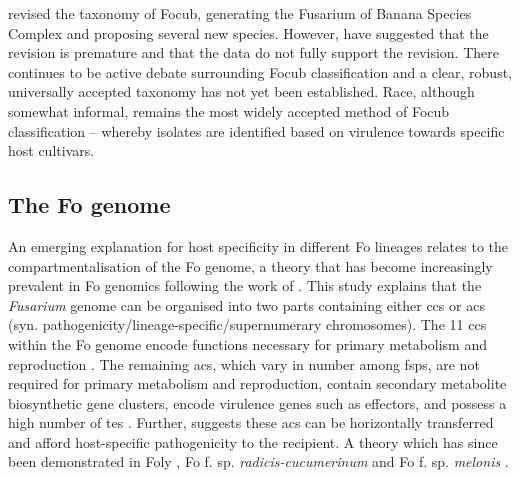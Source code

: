 \textcite{Maryani2019} revised the taxonomy of \ac{Focub}, generating the Fusarium of Banana Species Complex and proposing several new species. However, \textcite{Torres2021} have suggested that the revision is premature and that the data do not fully support the revision. There continues to be active debate surrounding \ac{Focub} classification and a clear, robust, universally accepted taxonomy has not yet been established. Race, although somewhat informal, remains the most widely accepted method of \ac{Focub} classification – whereby isolates are identified based on virulence towards specific host cultivars.  

\afterpage{



\clearpage
}

\subsection{The \acl{Fo} genome} 

An emerging explanation for host specificity in different \acf{Fo} lineages relates to the compartmentalisation of the \ac{Fo} genome, a theory that has become increasingly prevalent in \ac{Fo} genomics following the work of \textcite{Ma2010}. This study explains that the \textit{Fusarium} genome can be organised into two parts containing either \acp{cc} or \acp{ac} (syn. pathogenicity/lineage-specific/supern\-umerary chromosomes). The 11 \acp{cc} within the \ac{Fo} genome encode functions necessary for primary metabolism and reproduction \parencite{Dam2017}. The remaining \acp{ac}, which vary in number among \acp{fsp}, are not required for primary metabolism and reproduction, contain secondary metabolite biosynthetic gene clusters, encode virulence genes such as effectors, and possess a high number of \acp{te} \parencite{Ma2010, Schmidt2013, Witte2021}. Further, \textcite{Ma2010} suggests these \acp{ac} can be horizontally transferred and afford host-specific pathogenicity to the recipient. A theory which has since been demonstrated in \acf{Foly} \parencite{Vlaardingerbroek2016a, Vlaardingerbroek2016b, Li2020a}, \ac{Fo} f. sp. \textit{radicis-cucumerinum} \parencite{Dam2017} and \ac{Fo} f. sp.  \textit{melonis} \parencite{Li2020b}. 
 
